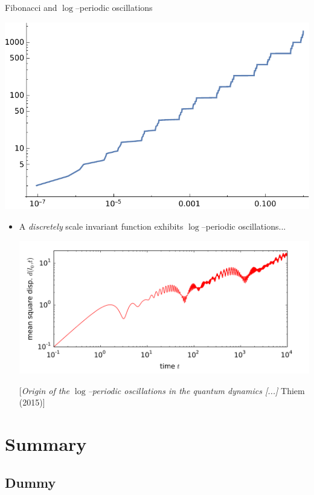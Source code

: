 \documentclass[xcolor=x11names,compress,professionalfonts]{beamer}
\renewcommand{\(}{\begin{columns}}
\renewcommand{\)}{\end{columns}}
\newcommand{\<}[1]{\begin{column}{#1}}
\renewcommand{\>}{\end{column}}
\begin{document}
\begin{frame}{Fibonacci and $\log$--periodic oscillations}
	
	{\centering
    	\includegraphics[scale=.35]{idoslog.pdf}
    	
    }
    \begin{itemize}
	\item A \textit{discretely} scale invariant function exhibits $\log$--periodic oscillations...

    {\centering
    	\includegraphics[scale=.15]{thiem.png}
    	
    	\scriptsize
    
    [\textit{Origin of the $\log$--periodic oscillations in the quantum dynamics [...]} Thiem (2015)]
    	
     }
\end{itemize}

\end{frame}

\section{Summary}
\subsection{Dummy}
\end{document}
